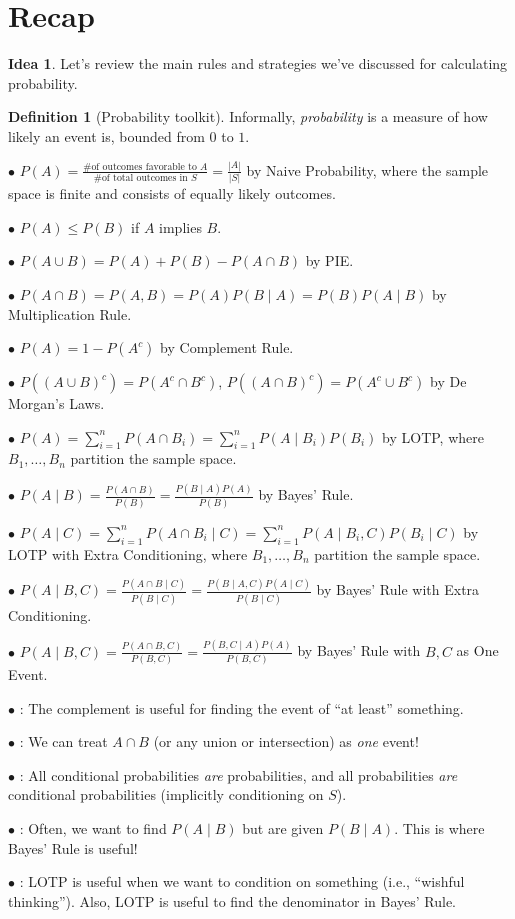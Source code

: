 \documentclass[12pt,oneside]{article}
\newcommand{\tip}{\textbf{\faLightbulb}: }
\theoremstyle{definition}
\newtheorem{definition}{Definition}
\newtheorem*{idea}{Idea}
\theoremstyle{remark}
\begin{document}
\section{Recap}

\begin{idea}
Let's review the main rules and strategies we've discussed for calculating probability.
\end{idea}

\begin{definition}[Probability toolkit]
Informally, \textit{probability} is a measure of how likely an event is, bounded from $0$ to $1$.

$\bullet$ $P(A) = \frac{\text{\# of outcomes favorable to $A$}}{\text{\# of total outcomes in $S$}} = \frac{|A|}{|S|}$ by Naive Probability, where the sample space is finite and consists of equally likely outcomes.

$\bullet$ $P(A) \leq P(B)$ if $A$ implies $B$. 

$\bullet$ $P(A \cup B) = P(A) + P(B) - P(A \cap B)$ by PIE.

$\bullet$ $P(A \cap B) = P(A, B) = P(A) P(B \mid A) = P(B) P(A \mid B)$ by Multiplication Rule.

$\bullet$ $P(A) = 1 - P(A^c)$ by Complement Rule.

$\bullet$ $P((A \cup B)^c) = P(A^c \cap B^c)$, $P((A \cap B)^c) = P(A^c \cup B^c)$ by De Morgan's Laws.

$\bullet$ $P(A) = \sum_{i = 1}^{n} P(A \cap B_i) = \sum_{i = 1}^{n} P(A \mid B_i) P(B_i)$ by LOTP, where $B_1, \ldots, B_n$ partition the sample space.

$\bullet$ $P(A \mid B) = \frac{P(A \cap B)}{P(B)} = \frac{P(B \mid A) P(A)}{P(B)}$ by Bayes' Rule.

$\bullet$ $P(A \mid C) = \sum_{i = 1}^{n} P(A \cap B_i \mid C) = \sum_{i = 1}^{n} P(A \mid B_i, C) P(B_i \mid C)$ by LOTP with Extra Conditioning, where $B_1, \ldots, B_n$ partition the sample space.

$\bullet$ $P(A \mid B, C) = \frac{P(A \cap B \mid C)}{P(B \mid C)} = \frac{P(B \mid A, C) P(A \mid C)}{P(B \mid C)}$ by Bayes' Rule with Extra Conditioning.

$\bullet$ $P(A \mid B, C) = \frac{P(A \cap B, C)}{P(B, C)} = \frac{P(B, C \mid A) P(A)}{P(B, C)}$ by Bayes' Rule with $B, C$ as One Event.

$\bullet$ \tip The complement is useful for finding the event of \enquote{at least} something.

$\bullet$ \tip We can treat $A \cap B$ (or any union or intersection) as \textit{one} event!

$\bullet$ \tip All conditional probabilities \textit{are} probabilities, and all probabilities \textit{are} conditional probabilities (implicitly conditioning on $S$).

$\bullet$ \tip Often, we want to find $P(A \mid B)$ but are given $P(B \mid A)$. This is where Bayes' Rule is useful!

$\bullet$ \tip LOTP is useful when we want to condition on something (i.e., \enquote{wishful thinking}). Also, LOTP is useful to find the denominator in Bayes' Rule.
\end{definition}
\end{document}
